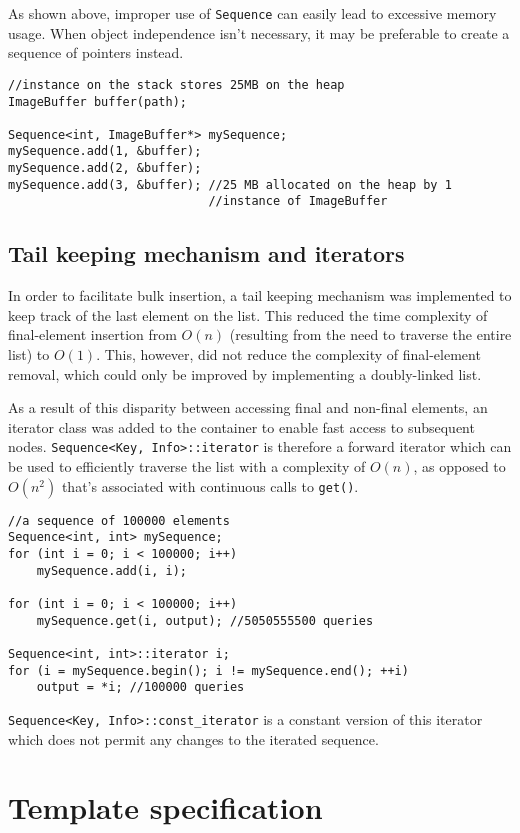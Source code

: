 ﻿\documentclass{article}
\begin{document}
As shown above, improper use of {\tt Sequence} can easily lead to excessive
memory usage. When object independence isn't necessary, it may be preferable
to create a sequence of pointers instead.

\begin{verbatim}
//instance on the stack stores 25MB on the heap
ImageBuffer buffer(path);

Sequence<int, ImageBuffer*> mySequence;
mySequence.add(1, &buffer);
mySequence.add(2, &buffer);
mySequence.add(3, &buffer); //25 MB allocated on the heap by 1
                            //instance of ImageBuffer
\end{verbatim}

\subsection{Tail keeping mechanism and iterators}

In order to facilitate bulk insertion, a tail keeping mechanism was implemented
to keep track of the last element on the list. This reduced the time complexity
of final-element insertion from $O(n)$ (resulting from the need to traverse the
entire list) to $O(1)$. This, however, did not reduce the complexity of
final-element removal, which could only be improved by implementing a
doubly-linked list.

As a result of this disparity between accessing final and non-final elements,
an iterator class was added to the container to enable fast access to subsequent
nodes. {\tt Sequence<Key, Info>::iterator} is therefore a forward iterator
which can be used to efficiently traverse the list with a complexity of $O(n)$,
as opposed to $O(n^2)$ that's associated with continuous calls to {\tt get()}.

\begin{verbatim}
//a sequence of 100000 elements
Sequence<int, int> mySequence;
for (int i = 0; i < 100000; i++)
    mySequence.add(i, i);

for (int i = 0; i < 100000; i++)
    mySequence.get(i, output); //5050555500 queries

Sequence<int, int>::iterator i;
for (i = mySequence.begin(); i != mySequence.end(); ++i)
    output = *i; //100000 queries
\end{verbatim}

{\tt Sequence<Key, Info>::const\_iterator} is a constant version of this iterator
which does not permit any changes to the iterated sequence.

\section{Template specification}
\end{document}
